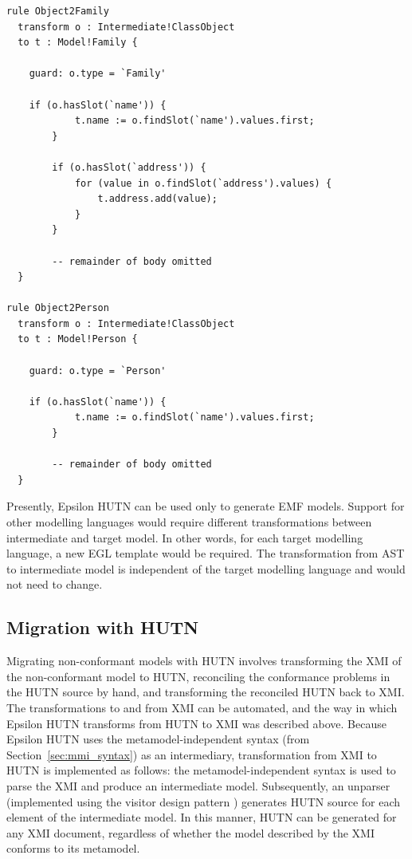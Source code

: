\begin{lstlisting}[caption=The M2M transformation generated by HUTN for the Families metamodel, label=lst:hutn_generated_transformation, language=ETL]
rule Object2Family
  transform o : Intermediate!ClassObject
  to t : Model!Family {

    guard: o.type = `Family'

    if (o.hasSlot(`name')) {
			t.name := o.findSlot(`name').values.first;
		}
		
		if (o.hasSlot(`address')) {
			for (value in o.findSlot(`address').values) {
				t.address.add(value);
			}
		}
		
		-- remainder of body omitted
  }

rule Object2Person
  transform o : Intermediate!ClassObject
  to t : Model!Person {

    guard: o.type = `Person'

    if (o.hasSlot(`name')) {
			t.name := o.findSlot(`name').values.first;
		}
		
		-- remainder of body omitted
  }
\end{lstlisting}

Presently, Epsilon HUTN can be used only to generate EMF models. Support for other modelling languages would require different transformations between intermediate and target model. In other words, for each target modelling language, a new EGL template would be required. The transformation from AST to intermediate model is independent of the target modelling language and would not need to change.


\subsection{Migration with HUTN}
\label{subsec:migration_with_hutn}
Migrating non-conformant models with HUTN involves transforming the XMI of the non-conformant model to HUTN, reconciling the conformance problems in the HUTN source by hand, and transforming the reconciled HUTN back to XMI. The transformations to and from XMI can be automated, and the way in which Epsilon HUTN transforms from HUTN to XMI was described above. Because Epsilon HUTN uses the metamodel-independent syntax (from Section~\ref{sec:mmi_syntax}) as an intermediary, transformation from XMI to HUTN is implemented as follows: the metamodel-independent syntax is used to parse the XMI and produce an intermediate model. Subsequently, an unparser (implemented using the visitor design pattern \cite{gamma95patterns}) generates HUTN source for each element of the intermediate model. In this manner, HUTN can be generated for any XMI document, regardless of whether the model described by the XMI conforms to its metamodel.

